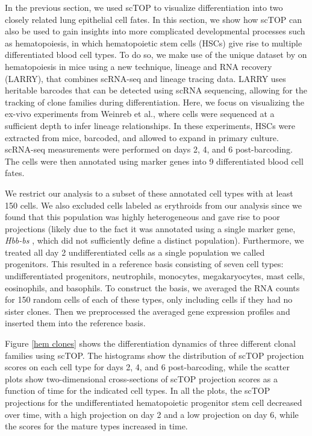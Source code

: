 \documentclass[vruler,JEB]{COB}%
\begin{document}
In the previous section, we used scTOP to visualize differentiation into two closely related lung epithelial cell fates. In this section, we show how scTOP can also be used to gain insights into more complicated developmental processes such as hematopoiesis, in which hematopoietic stem cells (HSCs) give rise to multiple differentiated blood cell types. To do so, we make use of the unique dataset by \cite{weinreb_lineage_2020} on hematopoiesis in mice using a new technique, lineage and RNA recovery (LARRY), that combines scRNA-seq and lineage tracing data. LARRY uses heritable barcodes that can be detected using scRNA sequencing, allowing for the tracking of clone families during differentiation. Here, we focus on visualizing the ex-vivo experiments from Weinreb et al., where cells were sequenced at a sufficient depth to infer lineage relationships. In these experiments, HSCs were extracted from mice, barcoded, and allowed to expand in primary culture. scRNA-seq measurements were performed on days 2, 4, and 6 post-barcoding. The cells were then annotated using marker genes into 9 differentiated blood cell fates. 

We restrict our analysis to a subset of these annotated cell types with at least 150 cells. We also excluded cells labeled as erythroids from our analysis since we found that this population was highly heterogeneous and gave rise to poor projections (likely due to the fact it was annotated using a single marker gene, \textit{Hbb-bs} \citep{weinreb_lineage_2020}, which did not sufficiently define a distinct population). Furthermore, we treated all day 2 undifferentiated cells as a single population we called progenitors. This resulted in a reference basis consisting of seven cell types: undifferentiated progenitors, neutrophils, monocytes, megakaryocytes, mast cells, eosinophils, and basophils. To construct the basis, we averaged the RNA counts for 150 random cells of each of these types, only including cells if they had no sister clones. Then we preprocessed the averaged gene expression profiles and inserted them into the reference basis.

Figure \ref{hem clones} shows the differentiation dynamics of three different clonal families using scTOP. The histograms show the distribution of scTOP projection scores on each cell type for days 2, 4, and 6 post-barcoding, while the scatter plots show two-dimensional cross-sections of scTOP projection scores as a function of time for the indicated cell types. In all the plots, the scTOP projections for the undifferentiated hematopoietic progenitor stem cell decreased over time, with a high projection on day 2 and a low projection on day 6, while the scores for the mature types increased in time. 
\end{document}

